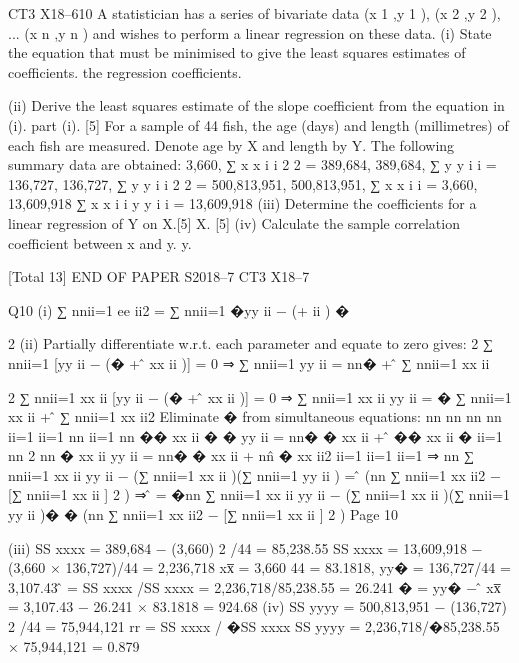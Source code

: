 \documentclass[a4paper,12pt]{article}
\begin{document}
CT3 X18–610
A statistician has a series of bivariate data {(x 1 ,y 1 ), (x 2 ,y 2 ), ... (x n ,y n )} and wishes to
perform a linear regression on these data.
(i) State the equation that must be minimised to give the least squares estimates of
coefficients.
the regression coefficients.

(ii) Derive the least squares estimate of the slope coefficient from the equation in
(i).
part (i).
[5]
For a sample of 44 fish, the age (days) and length (millimetres) of each fish are
measured. Denote age by X and length by Y. The following summary data are
obtained:
3,660, ∑ x x i i 2 2 = 389,684,
389,684, ∑ y y i i = 136,727,
136,727, ∑ y y i i 2 2 = 500,813,951,
500,813,951,
∑ x x i i = 3,660,
13,609,918
∑ x x i i y y i i = 13,609,918
(iii) Determine the coefficients for a linear regression of Y on X.[5]
X.
[5]
(iv)
 Calculate the sample correlation coefficient between x and y.
y.

[Total 13]
END OF PAPER
S2018–7 
CT3 X18–7

Q10
(i) ∑ nnii=1 ee ii2 = ∑ nnii=1 �yy ii − (\alpha\alpha + \beta\betaxx ii ) �

2
(ii) Partially differentiate w.r.t. each parameter and equate to zero gives:
2 ∑ nnii=1 [yy ii − (\alpha\alpha� + \beta\betâ xx ii )] = 0 ⇒ ∑ nnii=1 yy ii = nn\alpha\alpha� + \beta\betâ ∑ nnii=1 xx ii

2 ∑ nnii=1 xx ii [yy ii − (\alpha\alpha� + \beta\betâ xx ii )] = 0 ⇒ ∑ nnii=1 xx ii yy ii = \alpha\alpha� ∑ nnii=1 xx ii + \beta\betâ ∑ nnii=1 xx ii2
Eliminate \alpha\alpha� from simultaneous equations:
nn
nn nn nn
ii=1 ii=1
nn ii=1
nn
�� xx ii � � yy ii = nn\alpha\alpha� � xx ii + \beta\betâ �� xx ii �
ii=1
nn
2
nn � xx ii yy ii = nn\alpha\alpha� � xx ii + nn\beta\betâ � xx ii2
ii=1
ii=1
ii=1
⇒ nn ∑ nnii=1 xx ii yy ii − (∑ nnii=1 xx ii )(∑ nnii=1 yy ii ) = \beta\betâ (nn ∑ nnii=1 xx ii2 − [∑ nnii=1 xx ii ] 2 )
⇒ \beta\betâ = �nn ∑ nnii=1 xx ii yy ii − (∑ nnii=1 xx ii )(∑ nnii=1 yy ii )� � (nn ∑ nnii=1 xx ii2 − [∑ nnii=1 xx ii ] 2 )
Page 10



(iii) SS xxxx = 389,684 − (3,660) 2 /44 = 85,238.55
SS xxxx = 13,609,918 − (3,660 × 136,727)/44 = 2,236,718
xx̅ =
3,660
44
= 83.1818, yy� = 136,727/44 = 3,107.43
\beta\betâ = SS xxxx /SS xxxx = 2,236,718/85,238.55 = 26.241
\alpha\alpha� = yy� − \beta\betâ xx̅ = 3,107.43 − 26.241 × 83.1818 = 924.68
(iv) SS yyyy = 500,813,951 − (136,727) 2 /44 = 75,944,121
rr = SS xxxx / �SS xxxx SS yyyy = 2,236,718/�85,238.55 × 75,944,121 = 0.879







\end{document}
